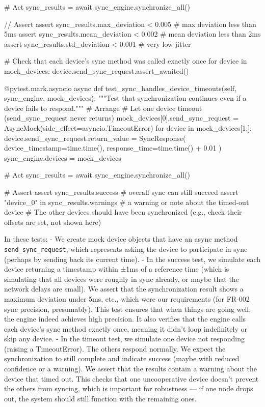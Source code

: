 \documentclass[11pt,a4paper]{report}
\begin{document}
            # Act
            sync\_results = await sync\_engine.synchronize\_all()

            // Assert
            assert sync\_results.max\_deviation < 0.005  # max deviation less than 5ms
            assert sync\_results.mean\_deviation < 0.002  # mean deviation less than 2ms
            assert sync\_results.std\_deviation < 0.001  # very low jitter

            # Check that each device's sync method was called exactly once
            for device in mock\_devices:
                device.send\_sync\_request.assert\_awaited()

        @pytest.mark.asyncio
        async def test\_sync\_handles\_device\_timeouts(self, sync\_engine, mock\_devices):
            """Test that synchronization continues even if a device fails to respond."""
            # Arrange
            # Let one device timeout (send\_sync\_request never returns)
            mock\_devices[0].send\_sync\_request = AsyncMock(side\_effect=asyncio.TimeoutError)
            for device in mock\_devices[1:]:
                device.send\_sync\_request.return\_value = SyncResponse(
                    device\_timestamp=time.time(), response\_time=time.time() + 0.01
                )
            sync\_engine.devices = mock\_devices

            # Act
            sync\_results = await sync\_engine.synchronize\_all()

            # Assert
            assert sync\_results.success  # overall sync can still succeed
            assert "device\_0" in sync\_results.warnings  # a warning or note about the timed-out device
            # The other devices should have been synchronized (e.g., check their offsets are set, not shown here)

In these tests: - We create mock device objects that have an async
method \texttt{send\_sync\_request}, which represents asking the device to
participate in sync (perhaps by sending back its current time). - In the
success test, we simulate each device returning a timestamp within ±1ms
of a reference time (which is simulating that all devices were roughly
in sync already, or maybe that the network delays are small). We assert
that the synchronization result shows a maximum deviation under 5ms,
etc., which were our requirements (for FR-002 sync precision,
presumably). This test ensures that when things are going well, the
engine indeed achieves high precision. It also verifies that the engine
calls each device's sync method exactly once, meaning it didn't loop
indefinitely or skip any device. - In the timeout test, we simulate one
device not responding (raising a TimeoutError). The others respond
normally. We expect the synchronization to still complete and indicate
success (maybe with reduced confidence or a warning). We assert that the
results contain a warning about the device that timed out. This checks
that one uncooperative device doesn't prevent the others from syncing,
which is important for robustness --- if one node drops out, the system
should still function with the remaining ones.
\end{document}
